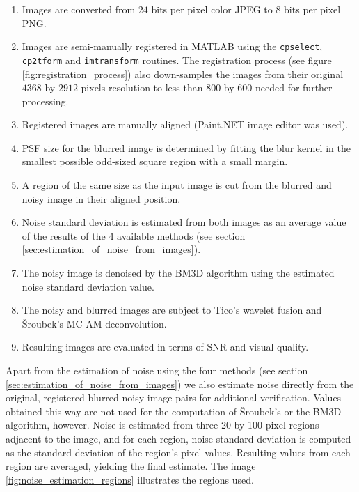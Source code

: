 \documentclass[12pt,notitlepage]{report}
\begin{document}
\begin{enumerate}
\item Images are converted from $24$ bits per pixel color JPEG to $8$ bits per pixel PNG.
\item Images are semi-manually registered in MATLAB using the \texttt{cpselect}, \texttt{cp2tform} and \texttt{imtransform} routines. The registration process (see figure \ref{fig:registration_process}) also down-samples the images from their original $4368$ by $2912$ pixels resolution to less than $800$ by $600$ needed for further processing. 
\item Registered images are manually aligned (Paint.NET image editor was used). %
\item PSF size for the blurred image is determined by fitting the blur kernel in the smallest possible odd-sized square region with a small margin.
\item A region of the same size as the input image is cut from the blurred and noisy image in their aligned position.
\item Noise standard deviation is estimated from both images as an average value of the results of the 4 available methods (see section \ref{sec:estimation_of_noise_from_images}).
\item The noisy image is denoised by the BM3D algorithm using the estimated noise standard deviation value.
\item The noisy and blurred images are subject to Tico's wavelet fusion and Šroubek's MC-AM deconvolution.
\item Resulting images are evaluated in terms of SNR and visual quality.
\end{enumerate}

Apart from the estimation of noise using the four methods (see section \ref{sec:estimation_of_noise_from_images}) we also estimate noise directly from the original, registered  blurred-noisy image pairs for additional verification. Values obtained this way are not used for the computation of Šroubek's or the BM3D algorithm, however. Noise is estimated from three 20 by 100 pixel regions adjacent to the image, and for each region, noise standard deviation is computed as the standard deviation of the region's pixel values. Resulting values from each region are averaged, yielding the final estimate. The image \ref{fig:noise_estimation_regions} illustrates the regions used. 
\end{document}
